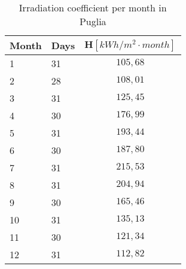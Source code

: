 \begin{table}[p]
\centering
\begin{tabular}{|l|l|c|}
\hline
\rowcolor{bluepoli!40} \textbf{Month} & \textbf{Days} & $\textbf{H} [kWh/m^2\cdot month]$ \\ \hline
1              & 31            & $105,68$                                                                                                              \\ \hline
2              & 28            & $108,01$                                                                                                              \\ \hline
3              & 31            & $125,45$                                                                                                              \\ \hline
4              & 30            & $176,99$                                                                                                              \\ \hline
5              & 31            & $193,44$                                                                                                              \\ \hline
6              & 30            & $187,80$                                                                                                              \\ \hline
7              & 31            & $215,53$                                                                                                              \\ \hline
8              & 31            & $204,94$                                                                                                              \\ \hline
9              & 30            & $165,46$                                                                                                              \\ \hline
10             & 31            & $135,13$                                                                                                              \\ \hline
11             & 30            & $121,34$                                                                                                              \\ \hline
12             & 31            & $112,82$                                                                                                              \\ \hline
\end{tabular}
\caption{Irradiation coefficient per month in Puglia}
\label{tab:hpuglia}
\end{table}